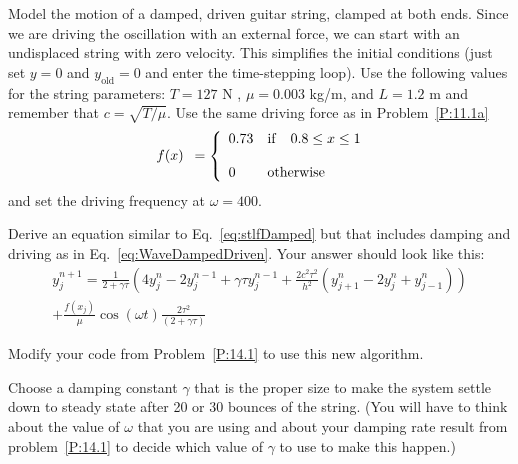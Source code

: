 

\begin{enumerate}
  \probtwo \label{P:14.2} Model the motion of a damped, driven guitar
  string, clamped at both ends.  Since we are driving the oscillation with
  an external force, we can start with an undisplaced string with zero
  velocity.  This simplifies the initial conditions (just set $y=0$
  and $y_\mathrm{old}=0$ and enter the time-stepping loop). Use the
  following values for the string parameters: $T = 127$ N , $\mu =
  0.003$ kg/m, and $L = 1.2$ m and remember that $c=\sqrt{T/
    \mu}$. Use the same driving force as in Problem~\ref{P:11.1a}
\begin{equation}
\begin{array}{c}
 \\
f(x) \\
 \\
\end{array}
=
\left\{
\begin{array}{ll}
0.73 & {\rm if~~~} 0.8 \le x \le 1 \\
 & \\
0 & {\rm otherwise} \\
\end{array}
\right.
\end{equation}
and set the driving frequency at $\omega=400$.  
\begin{enumerate}
\subprob Derive an equation similar to Eq.~\eqref{eq:stlfDamped} but
that includes damping and driving as in
Eq.~\eqref{eq:WaveDampedDriven}.  Your answer should look like this:
\begin{multline}
    y_j^{n+1} = \frac{1}{2+\gamma \tau} \left (
    4 y_j^n - 2y_j^{n-1} + \gamma \tau y_j^{n-1}
    + \frac{2 c^2 \tau^2}{h^2} \left( y_{j+1}^n - 2 y_j^n + y_{j-1}^n
    \right) \right)\\ + \frac{f(x_j)}{\mu} \cos(\omega t) 
  \frac{2\tau^2}{(2 + \gamma \tau)}
\end{multline}

\subprob Modify your code from Problem~\ref{P:14.1} to use this new
algorithm.

\subprob Choose a damping constant $\gamma$ that is the proper size to
make the system settle down to steady state after 20 or 30 bounces of
the string. (You will have to think about the value of $\omega$ that
you are using and about your damping rate result from
problem~\ref{P:14.1} to decide which value of $\gamma$ to use to make
this happen.)


\end{enumerate}
\end{enumerate}

